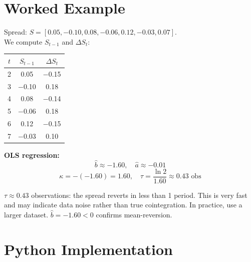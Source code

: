 \documentclass[10pt,a4paper,twocolumn]{article}
\begin{document}
\section{Worked Example}

\begin{tcolorbox}[exbox={Setup}]
Spread: $S = [0.05, -0.10, 0.08, -0.06, 0.12, -0.03, 0.07]$.\\
We compute $S_{t-1}$ and $\Delta S_t$:
\end{tcolorbox}

\begin{center}{\small
\begin{tabular}{@{}ccc@{}}
\toprule
$t$ & $S_{t-1}$ & $\Delta S_t$\\\midrule
2 & 0.05 & $-$0.15\\
3 & $-$0.10 & 0.18\\
4 & 0.08 & $-$0.14\\
5 & $-$0.06 & 0.18\\
6 & 0.12 & $-$0.15\\
7 & $-$0.03 & 0.10\\
\bottomrule
\end{tabular}
}\end{center}

\noindent\textbf{OLS regression:}
\[
  \hat b \approx -1.60, \quad \hat a \approx -0.01
\]
\[
  \kappa = -(-1.60) = 1.60, \quad
  \tau = \frac{\ln 2}{1.60} \approx 0.43 \text{ obs}
\]

\begin{tcolorbox}[resultbox={Interpretation}]
$\tau \approx 0.43$ observations: the spread reverts in less than
1 period.  This is very fast and may indicate data noise rather than
true cointegration.  In practice, use a larger dataset.
$\hat b = -1.60 < 0$ confirms mean-reversion.
\end{tcolorbox}

\section{Python Implementation}
\end{document}
